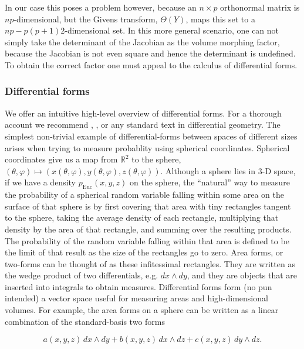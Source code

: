 \documentclass{article}
\begin{document}
In our case this poses a problem however, because an $n \times p$ orthonormal matrix is $np$-dimensional, but the Givens transform, $\Theta(Y)$, maps this set to a $np - p(p+1)2$-dimensional set. In this more general scenario, one can not simply take the determinant of the Jacobian as the volume morphing factor, because the Jacobian is not even square and hence the determinant is undefined. To obtain the correct factor one must appeal to the calculus of differential forms. 

\subsubsection{Differential forms}\label{differentialFormsSection}

We offer an intuitive high-level overview of differential forms. For a thorough account we recommend \citet{muirhead2009aspects}, \citet{edelman200518}, or any standard text in differential geometry. The simplest non-trivial example of differential-forms between spaces of different sizes arises when trying to measure probablity using spherical coordinates. Spherical coordinates give us a map from $\mathbb{R}^2$ to the sphere, $(\theta, \varphi) \mapsto (x(\theta,\varphi), y(\theta,\varphi), z(\theta,\varphi))$. Although a sphere lies in 3-D space, if we have a density $p_\mathrm{Euc}(x,y,z)$ on the sphere, the ``natural'' way to measure the probability of a spherical random variable falling within some area on the surface of that sphere is by first covering that area with tiny rectangles tangent to the sphere, taking the average density of each rectangle, multiplying that density by the area of that rectangle, and summing over the resulting products. The probability of the random variable falling within that area is defined to be the limit of that result as the size of the rectangles go to zero. Area forms, or two-forms can be thought of as these infitessimal rectangles. They are written as the wedge product of two differentials, e.g. $dx \wedge dy$, and they are objects that are inserted into integrals to obtain measures. Differential forms form (no pun intended) a vector space useful for measuring areas and high-dimensional volumes. For example, the area forms on a sphere can be written as a linear combination of the standard-basis two forms

\begin{equation}
\label{eq:EuclideanAreaForm}
a(x,y,z)\, dx \wedge dy + b(x,y,z)\, dx \wedge dz + c(x,y,z)\, dy \wedge dz.
\end{equation}
\end{document}
